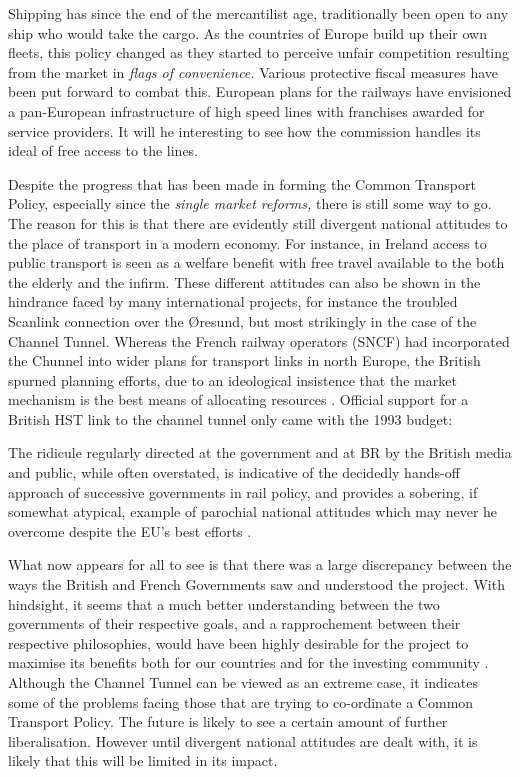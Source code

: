 Shipping has since the end of the mercantilist age, traditionally been open to any ship who would take the cargo. As the countries of Europe build up their own fleets, this policy changed as they started to perceive unfair competition resulting from the market in \textit{flags of convenience.} Various protective fiscal measures have been put forward to combat this. European plans for the railways have envisioned a pan-European infrastructure of high speed lines with franchises awarded for service providers. It will he interesting to see how the commission handles its ideal of free access to the lines.

Despite the progress that has been made in forming the Common Transport Policy, especially since the \textit{single market reforms,} there is still some way to go. The reason for this is that there are evidently still divergent national attitudes to the place of transport in a modern economy. For instance, in Ireland access to public transport is seen as a welfare benefit with free travel available to the both the elderly and the infirm. These different attitudes can also be shown in the hindrance faced by many international projects, for instance the troubled Scanlink connection over the \O resund, but most strikingly in the case of the Channel Tunnel. Whereas the French railway operators (SNCF) had incorporated the Chunnel into wider plans for transport links in north Europe, the British spurned planning efforts, due to an ideological insistence that the market mechanism is the best means of allocating resources \citep{Anderson:1992}. Official support for a British HST link to the channel tunnel only came with the 1993 budget:

\begin{displayquote}
The ridicule regularly directed at the government and at BR by the British media and public, while often overstated, is indicative of the decidedly hands-off approach of successive governments in rail policy, and provides a sobering, if somewhat atypical, example of parochial national attitudes which may never he overcome despite the EU's best efforts \citep{Ross:1994}.
\end{displayquote}

What now appears for all to see is that there was a large discrepancy between the ways the British and French Governments saw and understood the project. With hindsight, it seems that a much better understanding between the two governments of their respective goals, and a rapprochement between their respective philosophies, would have been highly desirable for the project to maximise its benefits both for our countries and for the investing community \citep{Bernard:1994}. Although the Channel Tunnel can be viewed as an extreme case, it indicates some of the problems facing those that are trying to co-ordinate a Common Transport Policy. The future is likely to see a certain amount of further liberalisation. However until divergent national attitudes are dealt with, it is likely that this will be limited in its impact.